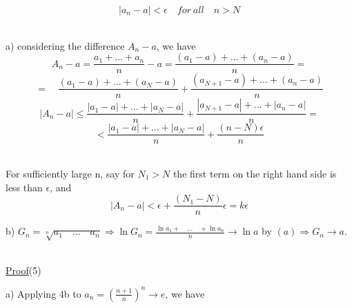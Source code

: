 \documentclass[11pt]{amsbook}
\begin{document}



    \[ \left| a_n - a \right| < \epsilon \quad for  \: all \quad n > N \]
    
    
    \\ a) considering the difference \(A_n - a\), we have
    \[ A_n - a = \frac{a_1 + ... + a_n}{n} - a = \frac{(a_1- a) + ... + (a_n - a)}{n} =\]
    \[ = \quad \frac{(a_1- a) + ... + (a_N - a)}{n} + \frac{(a_{N+1}- a) + ... + (a_n - a)}{n}\]
    \[ \left| A_n - a \right| \leq \frac{\left|a_1- a\right| + ... + \left|a_N - a\right|}{n} + \frac{\left|a_{N+1}- a\right| + ... + \left|a_n - a\right|}{n} = \]
    \[<  \frac{\left|a_1- a\right| + ... + \left|a_N - a\right|}{n} + \frac{(n-N)\epsilon}{n} \]
    
    \\ For sufficiently large n, say for \(N_1 > N\) the first term on the right hand side is less than $\epsilon$, and 
    \[ \left| A_n - a \right| < \epsilon + \frac{(N_1-N)}{n}\epsilon = k\epsilon \]
    
    b) \(G_n = \sqrt[n]{a_1 \quad ... \quad a_n} \Rightarrow  \ln G_n = \frac{\ln a_1 + \quad ... \quad + \ln a_n}{n} \to \ln a\) by \((a) \Rightarrow G_n \to a\).

   \\ \underline{Proof}(5)
   
   a) Applying 4b to \(a_n = (\frac{n+1}{n})^n \to e\), we have
    

\end{document}
